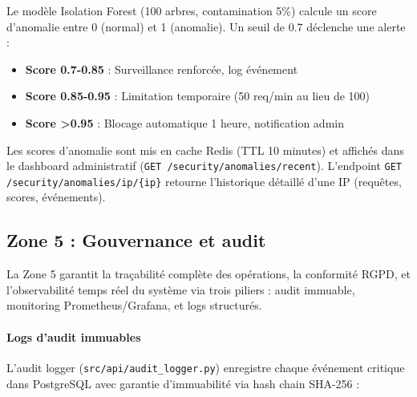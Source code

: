 Le modèle Isolation Forest (100 arbres, contamination 5\%) calcule un score d'anomalie entre 0 (normal) et 1 (anomalie). Un seuil de 0.7 déclenche une alerte :

\begin{itemize}
    \item \textbf{Score 0.7-0.85} : Surveillance renforcée, log événement
    \item \textbf{Score 0.85-0.95} : Limitation temporaire (50 req/min au lieu de 100)
    \item \textbf{Score >0.95} : Blocage automatique 1 heure, notification admin
\end{itemize}

Les scores d'anomalie sont mis en cache Redis (TTL 10 minutes) et affichés dans le dashboard administratif (\texttt{GET /security/anomalies/recent}). L'endpoint \texttt{GET /security/anomalies/ip/\{ip\}} retourne l'historique détaillé d'une IP (requêtes, scores, événements).


\subsection{Zone 5 : Gouvernance et audit}

La Zone 5 garantit la traçabilité complète des opérations, la conformité RGPD, et l'observabilité temps réel du système via trois piliers : audit immuable, monitoring Prometheus/Grafana, et logs structurés.

\paragraph{Logs d'audit immuables}

L'audit logger (\texttt{src/api/audit\_logger.py}) enregistre chaque événement critique dans PostgreSQL avec garantie d'immuabilité via hash chain SHA-256 :

